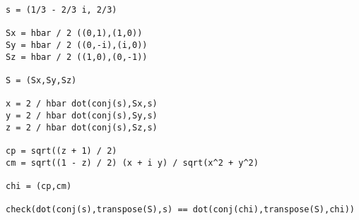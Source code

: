 
{\footnotesize\begin{verbatim}
s = (1/3 - 2/3 i, 2/3)

Sx = hbar / 2 ((0,1),(1,0))
Sy = hbar / 2 ((0,-i),(i,0))
Sz = hbar / 2 ((1,0),(0,-1))

S = (Sx,Sy,Sz)

x = 2 / hbar dot(conj(s),Sx,s)
y = 2 / hbar dot(conj(s),Sy,s)
z = 2 / hbar dot(conj(s),Sz,s)

cp = sqrt((z + 1) / 2)
cm = sqrt((1 - z) / 2) (x + i y) / sqrt(x^2 + y^2)

chi = (cp,cm)

check(dot(conj(s),transpose(S),s) == dot(conj(chi),transpose(S),chi))
\end{verbatim}}

